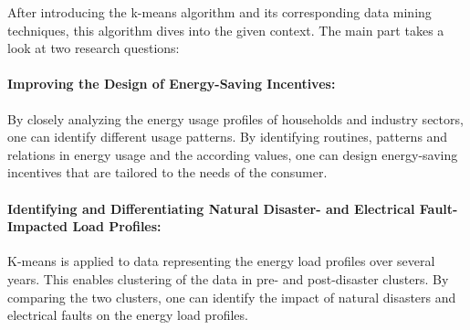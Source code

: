 After introducing the k-means algorithm and its corresponding data mining techniques, this algorithm dives into the given context.
The main part takes a look at two research questions:
\paragraph*{Improving the Design of Energy-Saving Incentives:} 
By closely analyzing the energy usage profiles of households and industry sectors, one can identify different usage patterns.
By identifying routines, patterns and relations in energy usage and the according values, one can design energy-saving incentives that are tailored to the needs of the consumer.
\paragraph*{Identifying and Differentiating Natural Disaster- and Electrical Fault-Impacted Load Profiles:}
K-means is applied to data representing the energy load profiles over several years.
This enables clustering of the data in pre- and post-disaster clusters.
By comparing the two clusters, one can identify the impact of natural disasters and electrical faults on the energy load profiles.
